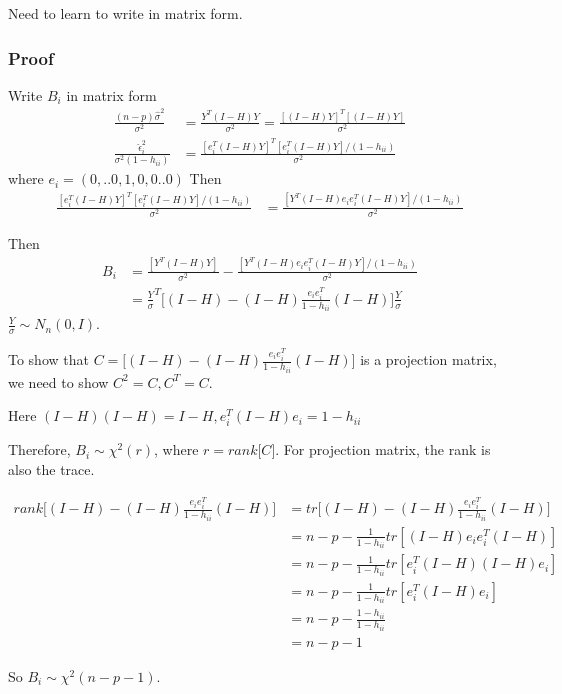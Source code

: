 Need to learn to write in matrix form. 



\subsubsection{Proof}
Write $B_i$ in matrix form
\begin{align*}
	\frac{(n-p)\hat{\sigma}^2 }{\sigma^2} &= \frac{Y^T (I-H) Y}{\sigma^2} = \frac{[(I-H)Y]^T [(I-H)Y]}{\sigma^2} \\
	\frac{\hat{\epsilon}_i^2}{\sigma^2(1-h_{ii})}&= \frac{[e_i^T (I-H)Y]^T [ e_i^T (I-H)Y]/(1- h_{ii})}{\sigma^2}
\end{align*}
where $e_i = (0,..0, 1, 0, 0..0)$ 
Then 
\begin{align*}
	\frac{[e_i^T (I-H)Y]^T [ e_i^T (I-H)Y]/(1- h_{ii})}{\sigma^2} & = \frac{[ Y^T (I-H) e_i e_i^T (I-H)Y]/(1- h_{ii})}{\sigma^2} 
\end{align*}

Then
\begin{align*}
	B_i &= \frac{[Y^T (I-H)Y]}{\sigma^2} -   \frac{[ Y^T (I-H) e_i e_i^T (I-H)Y]/(1- h_{ii})}{\sigma^2} \\
	&= \frac{Y}{\sigma}^T \Big[(I-H) - (I-H) \frac{e_i e_i^T }{1- h_{ii}} (I-H)\Big] \frac{Y}{\sigma}
\end{align*}
$\frac{Y}{\sigma} \sim N_n(0, I)$. 

To show that $C = \Big[(I-H) - (I-H) \frac{e_i e_i^T }{1- h_{ii}} (I-H)\Big]  $ is a projection matrix, we need to show $C^2 = C, C^T= C$.

Here $(I-H)(I-H) = I-H, e_i^T (I-H) e_i = 1- h_{ii}$ 

Therefore, $B_i \sim \chi^2(r)$, where $r = rank \Big[C \Big]$. For projection matrix, the rank is also the trace.

\begin{align*}
	rank \Big[(I-H) - (I-H) \frac{e_i e_i^T }{1- h_{ii}} (I-H)\Big] &= tr \Big[(I-H) - (I-H) \frac{e_i e_i^T }{1- h_{ii}} (I-H)\Big]  \\
	&= n-p - \frac{1}{1-h_{ii}} tr[(I-H) e_i e_i^T (I-H)] \\
	&= n-p -  \frac{1}{1-h_{ii}} tr[e_i^T (I-H) (I-H) e_i ] \\
	&= n-p -  \frac{1}{1-h_{ii}} tr[e_i^T (I-H)  e_i ] \\
	&= n-p -  \frac{1-h_{ii}}{1-h_{ii}} \\
	&= n-p-1
\end{align*}

So $B_i \sim \chi^2(n-p-1)$.

